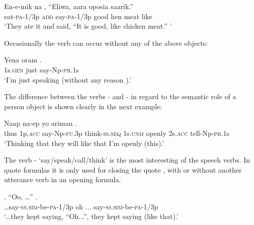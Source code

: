 \ea%
\label{ex:3:x320}
\gll En-e-mik na{\footnotemark} , ``Eliwa, aara oposia saarik.'' \\
eat-\textsc{pa}-1/3p \textsc{add} say-\textsc{pa}-1/3p good hen meat like\\
\glt`They ate it and said, ``It is good, like chicken meat.'' '
\z


Occasionally the verb can occur without any of the above objects:

\ea%
\label{ex:3:x321}
\gll Yena oram . \\
1s.\textsc{gen} just say-Np-\textsc{pr}.1s \\
\glt`I'm just speaking (without any reason ).'
\z

The difference between the verbs - and - in regard to the semantic role of a person object is shown clearly in the next example:

\ea%
\label{ex:3:x322}
\gll Naap   na-ep yo ariman   .
\\
thus 1p.\textsc{acc} say-Np-\textsc{fu}.3p think-\textsc{ss}.\textsc{seq} 1s.\textsc{unm} openly 2s.\textsc{acc} tell-Np-\textsc{pr}.1s\\
\glt`Thinking that they will  like that  I'm openly  (this).'
\z

The verb - `say/speak/call/think' is the most interesting of the speech verbs. In quote formulas it is only used for closing the quote , with or without another utterance verb in an opening formula.

\ea%
\label{ex:3:x323}
\gll {\dots}, ``Oo, {\dots}'' . \\
{\dots}say-\textsc{ss}.\textsc{sim}-be-\textsc{pa}-1/3p oh ... say-\textsc{ss}.\textsc{sim}-be-\textsc{pa}-1/3p \\
\glt`...they kept saying, ``Oh...'', they kept saying (like that).'
\z

